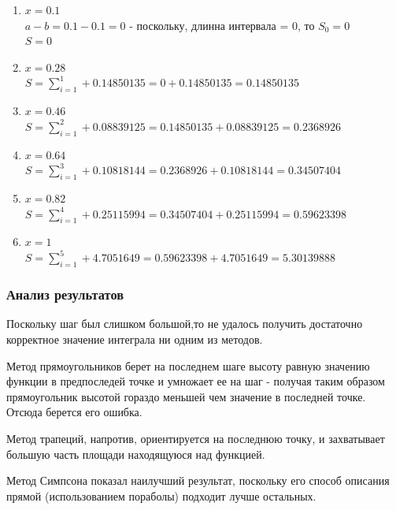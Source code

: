 \documentclass{article}
\begin{document}
\begin{enumerate}[label= \arabic{*}:]
  \item 
  $ x = 0.1$ \\
  $a-b = 0.1 - 0.1 = 0$ - поскольку, длинна интервала = 0, то $S_0 = 0$\\
  $S = 0$

  \item 
  $ x = 0.28$ \\ 
  $S = \sum\limits_{i=1}^1 + 0.14850135 = 0 + 0.14850135 = 0.14850135$ \\
  
  \item 
  $ x = 0.46$ \\
  $S = \sum\limits_{i=1}^2 + 0.08839125 = 0.14850135 + 0.08839125 = 0.2368926$\\
  
  \item 
  $ x = 0.64$ \\
  $S = \sum\limits_{i=1}^3 + 0.10818144 = 0.2368926 + 0.10818144 = 0.34507404$\\
  
  \item 
  $ x = 0.82$ \\
  $S = \sum\limits_{i=1}^4 + 0.25115994 = 0.34507404 + 0.25115994 = 0.59623398$\\
  
  \item 
  $ x = 1$ \\
  $S = \sum\limits_{i=1}^5 + 4.7051649 = 0.59623398 + 4.7051649 = 5.30139888$\\
  
\end{enumerate}

\subsubsection{Анализ результатов}
Поскольку шаг был слишком большой,то не удалось получить достаточно корректное
значение интеграла ни одним из методов.

Метод прямоугольников берет на последнем шаге высоту равную значению функции в
предпоследей точке и умножает ее на шаг - получая таким образом прямоугольник
высотой гораздо меньшей чем значение в последней точке. Отсюда берется его
ошибка.

Метод трапеций, напротив, ориентируется на последнюю точку, и захватывает
большую часть площади находящуюся над функцией.

Метод Симпсона показал наилучший результат, поскольку его способ описания прямой
(использованием пораболы) подходит лучше остальных.
\end{document}

